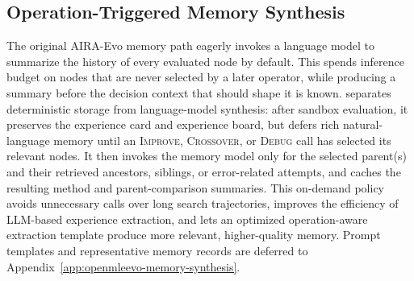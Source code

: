 \subsection{Operation-Triggered Memory Synthesis}
The original AIRA-Evo memory path eagerly invokes a language model to summarize the history of every evaluated node by default. This spends inference budget on nodes that are never selected by a later operator, while producing a summary before the decision context that should shape it is known. \openmleevo{} separates deterministic storage from language-model synthesis: after sandbox evaluation, it preserves the experience card and experience board, but defers rich natural-language memory until an \textsc{Improve}, \textsc{Crossover}, or \textsc{Debug} call has selected its relevant nodes. It then invokes the memory model only for the selected parent(s) and their retrieved ancestors, siblings, or error-related attempts, and caches the resulting method and parent-comparison summaries. This on-demand policy avoids unnecessary calls over long search trajectories, improves the efficiency of LLM-based experience extraction, and lets an optimized operation-aware extraction template produce more relevant, higher-quality memory. Prompt templates and representative memory records are deferred to Appendix~\ref{app:openmleevo-memory-synthesis}.

